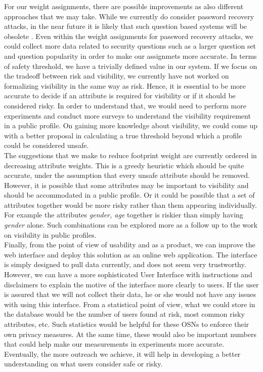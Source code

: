 \documentclass[10pt,conference]{IEEEtran}
\begin{document}
For our weight assignments, there are possible improvements as also different approaches that we may take. While we currently do consider password recovery attacks, in the near future it is likely that such question based systems will be obsolete \cite{google}. Even within the weight assignments for password recovery attacks, we could collect more data related to security questions such as a larger question set and question popularity in order to make our assignmets more accurate. In terms of safety threshold, we have a trivially defined value in our system. If we focus on the tradeoff between risk and visibility, we currently have not worked on formalizing visibility in the same way as risk. Hence, it is essential to be more accurate to decide if an attribute is required for visibility or if it should be considered risky. In order to understand that, we would need to perform more experiments and conduct more surveys to understand the visibility requirement in a public profile. On gaining more knowledge about visibility, we could come up with a better proposal in calculating a true threshold beyond which a profile could be considered unsafe.\\

The suggestions that we make to reduce footprint weight are currently ordered in decreasing attribute weights. This is a greedy heuristic which should be quite accurate, under the assumption that every unsafe attribute should be removed. However, it is possible that some attributes may be important to visibility and should be accommodated in a public profile. Or it could be possible that a set of attributes together would be more risky rather than them appearing individually. For example the attributes \textit{gender, age} together is riskier than simply having \textit{gender} alone. Such combinations can be explored more as a follow up to the work on visibility in public profiles.\\

Finally, from the point of view of usability and as a product, we can improve the web interface and deploy this solution as an online web application. The interface is simply designed to pull data currently, and does not seem very trustworthy. However, we can have a more sophisticated User Interface with instructions and disclaimers to explain the motive of the interface more clearly to users. If the user is assured that we will not collect their data, he or she would not have any issues with using this interface. From a statistical point of view, what we could store in the database would be the number of users found at risk, most common risky attributes, etc. Such statistics would be helpful for these OSNs to enforce their own privacy measures. At the same time, these would also be important numbers that could help make our measurements in experiments more accurate. Eventually, the more outreach we achieve, it will help in developing a better understanding on what users consider safe or risky. \\	
\end{document}
